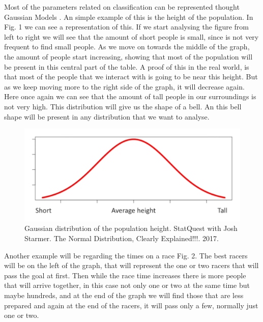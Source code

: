 \documentclass[conference]{IEEEtran}
\begin{document}
Most of the parameters related on classification can be represented thought Gaussian Models \cite{normal_dist}. An simple example of this is the height of the population. In Fig. 1 we can see a representation of this. If we start analysing the figure from left to right we will see that the amount of short people is small, since is not very frequent to find small people. As we move on towards the middle of the graph, the amount of people start increasing, showing that most of the population will be present in this central part of the table. A proof of this in the real world, is that most of the people that we interact with is going to be near this height. But as we keep moving more to the right side of the graph, it will decrease again. Here once again we can see that the amount of tall people in our surroundings is not very high. This distribution will give us the shape of a bell. An this bell shape will be present in any distribution that we want to analyse. 

\begin{figure}
	\label{fig:height}
	\includegraphics[scale=0.25]{imgs/height.png}
	\caption{Gaussian distribution of the population height. StatQuest with Josh Starmer. The Normal Distribution, Clearly Explained!!!. 2017.}
\end{figure}

Another example will be regarding the times on a race Fig. 2. The best racers will be on the left of the graph, that will represent the one or two racers that will pass the goal at first. Then while the race time increases there is more people that will arrive together, in this case not only one or two at the same time but maybe hundreds, and at the end of the graph we will find those that are less prepared and again at the end of the racers, it will pass only a few, normally just one or two.
\end{document}
